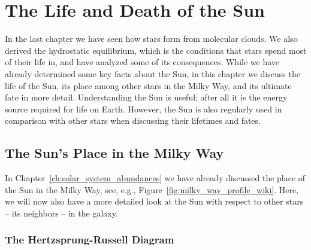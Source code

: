 
\chapter{The Life and Death of the Sun}\label{ch:sun}

In the last chapter we have seen how stars form from molecular clouds. We also derived the hydrostatic equilibrium, which is the conditions that stars spend most of their life in, and have analyzed some of its consequences. While we have already determined some key facts about the Sun, in this chapter we discuss the life of the Sun, its place among other stars in the Milky Way, and its ultimate fate in more detail. Understanding the Sun is useful; after all it is the energy source required for life on Earth. However, the Sun is also regularly used in comparison with other stars when discussing their lifetimes and fates.

\section{The Sun's Place in the Milky Way}

In Chapter~\ref{ch:solar_system_abundances} we have already discussed the place of the Sun in the Milky Way, see, e.g., Figure~\ref{fig:milky_way_profile_wiki}. Here, we will now also have a more detailed look at the Sun with respect to other stars -- its neighbors -- in the galaxy.

\subsection{The Hertzsprung-Russell Diagram}

